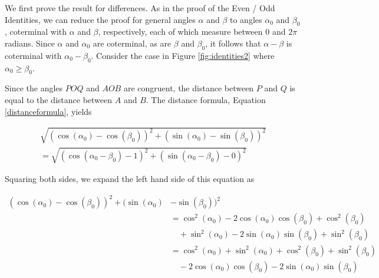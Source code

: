 We first prove the result for differences.  As in the proof of the Even / Odd Identities, we can reduce the proof for general angles $\alpha$ and $\beta$ to angles $\alpha_{0}$ and $\beta_{0}$, coterminal with $\alpha$ and $\beta$, respectively, each of which measure between $0$ and $2\pi$ radians.  Since $\alpha$ and $\alpha_{0}$ are coterminal, as are $\beta$ and $\beta_{0}$, it follows that $\alpha - \beta$ is coterminal with $\alpha_{0} - \beta_{0}$.  Consider the case in Figure \ref{fig:identities2} where $\alpha_{0} \geq \beta_{0}$.  



Since the angles $POQ$ and $AOB$ are congruent, the distance between $P$ and $Q$ is equal to the distance between $A$ and $B$.   The distance formula, Equation \ref{distanceformula}, yields

\begin{multline*}
\sqrt{(\cos(\alpha_{0}) - \cos(\beta_{0}))^2 + (\sin(\alpha_{0}) - \sin(\beta_{0}))^2 }\\
=\sqrt{(\cos(\alpha_{0} - \beta_{0}) - 1)^2 + (\sin(\alpha_{0} - \beta_{0}) - 0)^2}
\end{multline*}

Squaring both sides, we expand the left hand side of this equation as

\begin{align*}
(\cos(\alpha_{0}) - \cos(\beta_{0}))^2 + (\sin(\alpha_{0})& - \sin(\beta_{0}))^2 \\
& = \cos^2(\alpha_{0}) - 2\cos(\alpha_{0})\cos(\beta_{0}) + \cos^2(\beta_{0}) \\  
& \quad + \sin^2(\alpha_{0}) - 2\sin(\alpha_{0})\sin(\beta_{0})  +  \sin^2(\beta_{0}) \\ 
& =  \cos^2(\alpha_{0}) + \sin^2(\alpha_{0}) + \cos^2(\beta_{0}) + \sin^2(\beta_{0}) \\
& \quad -  2\cos(\alpha_{0})\cos(\beta_{0}) - 2\sin(\alpha_{0})\sin(\beta_{0})
\end{align*}

